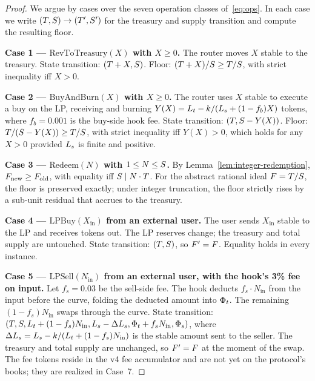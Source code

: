 \begin{proof}
We argue by cases over the seven operation classes of~\eqref{eq:ops}. In each case we write $(T, S) \to (T', S')$ for the treasury and supply transition and compute the resulting floor.

\textbf{Case 1 --- $\text{RevToTreasury}(X)$ with $X \geq 0$.} The router moves $X$ stable to the treasury. State transition: $(T + X, S)$. Floor: $(T + X)/S \geq T/S$, with strict inequality iff $X > 0$.

\textbf{Case 2 --- $\text{BuyAndBurn}(X)$ with $X \geq 0$.} The router uses $X$ stable to execute a buy on the LP, receiving and burning $Y(X) = L_t - k/(L_s + (1 - f_b) X)$ tokens, where $f_b = 0.001$ is the buy-side hook fee. State transition: $(T, S - Y(X))$. Floor: $T/(S - Y(X)) \geq T/S$, with strict inequality iff $Y(X) > 0$, which holds for any $X > 0$ provided $L_s$ is finite and positive.

\textbf{Case 3 --- $\text{Redeem}(N)$ with $1 \leq N \leq S$.} By Lemma~\ref{lem:integer-redemption}, $F_{\mathrm{new}} \geq F_{\mathrm{old}}$, with equality iff $S \mid N \cdot T$. For the abstract rational ideal $F = T/S$, the floor is preserved exactly; under integer truncation, the floor strictly rises by a sub-unit residual that accrues to the treasury.

\textbf{Case 4 --- $\text{LPBuy}(X_{\text{in}})$ from an external user.} The user sends $X_{\text{in}}$ stable to the LP and receives tokens out. The LP reserves change; the treasury and total supply are untouched. State transition: $(T, S)$, so $F' = F$. Equality holds in every instance.

\textbf{Case 5 --- $\text{LPSell}(N_{\text{in}})$ from an external user, with the hook's 3\% fee on input.} Let $f_s = 0.03$ be the sell-side fee. The hook deducts $f_s \cdot N_{\text{in}}$ from the input before the curve, folding the deducted amount into $\Phi_t$. The remaining $(1 - f_s) N_{\text{in}}$ swaps through the curve. State transition: $(T, S, L_t + (1 - f_s) N_{\text{in}}, L_s - \Delta L_s, \Phi_t + f_s N_{\text{in}}, \Phi_s)$, where $\Delta L_s = L_s - k/(L_t + (1 - f_s) N_{\text{in}})$ is the stable amount sent to the seller. The treasury and total supply are unchanged, so $F' = F$ at the moment of the swap. The fee tokens reside in the v4 fee accumulator and are not yet on the protocol's books; they are realized in Case~7.


\end{proof}
